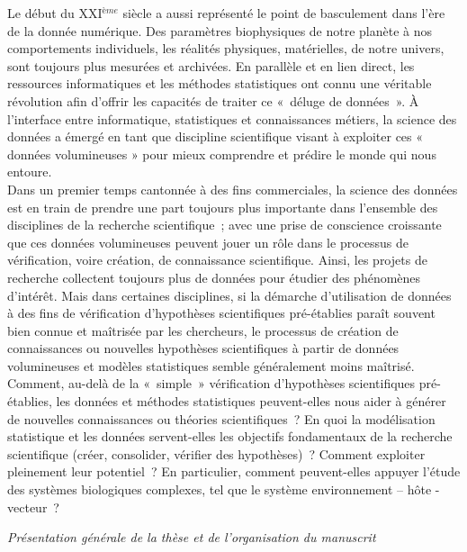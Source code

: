 \documentclass[12pt,twoside]{reedthesis}
\begin{document}
Le début du XXI\(^{ème}\) siècle a aussi représenté le point de basculement dans l'ère de la donnée numérique. Des paramètres biophysiques de notre planète à nos comportements individuels, les réalités physiques, matérielles, de notre univers, sont toujours plus mesurées et archivées. En parallèle et en lien direct, les ressources informatiques et les méthodes statistiques ont connu une véritable révolution afin d'offrir les capacités de traiter ce «~déluge de données~». À l'interface entre informatique, statistiques et connaissances métiers, la science des données a émergé en tant que discipline scientifique visant à exploiter ces « données volumineuses » pour mieux comprendre et prédire le monde qui nous entoure.\\

Dans un premier temps cantonnée à des fins commerciales, la science des données est en train de prendre une part toujours plus importante dans l'ensemble des disciplines de la recherche scientifique~; avec une prise de conscience croissante que ces données volumineuses peuvent jouer un rôle dans le processus de vérification, voire création, de connaissance scientifique. Ainsi, les projets de recherche collectent toujours plus de données pour étudier des phénomènes d'intérêt. Mais dans certaines disciplines, si la démarche d'utilisation de données à des fins de vérification d'hypothèses scientifiques pré-établies paraît souvent bien connue et maîtrisée par les chercheurs, le processus de création de connaissances ou nouvelles hypothèses scientifiques à partir de données volumineuses et modèles statistiques semble généralement moins maîtrisé.\\

Comment, au-delà de la «~simple~» vérification d'hypothèses scientifiques pré-établies, les données et méthodes statistiques peuvent-elles nous aider à générer de nouvelles connaissances ou théories scientifiques~? En quoi la modélisation statistique et les données servent-elles les objectifs fondamentaux de la recherche scientifique (créer, consolider, vérifier des hypothèses)~? Comment exploiter pleinement leur potentiel~? En particulier, comment peuvent-elles appuyer l'étude des systèmes biologiques complexes, tel que le système environnement -- hôte - vecteur~?\\

\pagebreak

\emph{Présentation générale de la thèse et de l'organisation du manuscrit}\\
\end{document}
